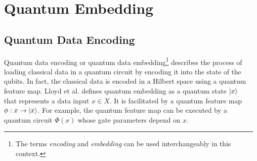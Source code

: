 
\chapter{Quantum Embedding}
\label{chapter:quantum_embedding} %






\section{Quantum Data Encoding}\label{section:quantum_data_encoding}
Quantum data encoding or quantum data embedding\footnote{The terms \textit{encoding} and \textit{embedding} can be used interchangeably in this context.} describes the process of loading classical data in a quantum circuit by encoding it into the state of the qubits. In fact, the classical data is encoded in a Hilbert space using a quantum feature map. Lloyd et al.\cite{Quantum_embeddings_for_machine_learning_2020} defines quantum embedding as a quantum state $\ket{x}$ that represents a data input $x \in X$. It is facilitated by a quantum feature map $\phi : x \rightarrow \ket{x}$. For example, the quantum feature map can be executed by a quantum circuit $\Phi(x)$ whose gate parameters depend on $x$.

